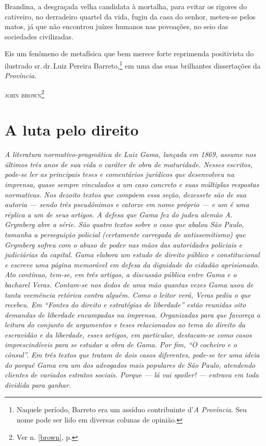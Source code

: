 Brandina, a desgraçada velha candidata à mortalha, para evitar os
rigores do cativeiro, no derradeiro quartel da vida, fugiu da casa do
senhor, meteu-se pelos matos, já que não encontrou juízes humanos nas
povoações, no seio das sociedades civilizadas.

Eis um fenômeno de metafísica que bem merece forte reprimenda
positivista do ilustrado sr.\,dr.\,Luiz Pereira Barreto,\footnote{Naquele
  período, Barreto era um assíduo contribuinte d'\emph{A Província}. Seu
  nome pode ser lido em diversas colunas de opinião.} em uma das suas
brilhantes dissertações da \emph{Província}.\medskip

\hfill\textsc{john brown}\footnote{Ver n. \ref{brown}, p. \pageref{brown}}

\part{A luta pelo direito} %


\begin{didas}
\emph{A literatura normativo-pragmática de Luiz Gama, lançada em 1869,
assume nos últimos três anos de sua vida o caráter de obra de
maturidade. Nesses escritos, pode-se ler as principais teses e
comentários jurídicos que desenvolveu na imprensa, quase sempre
vinculados a um caso concreto e suas múltiplas respostas normativas. Nos
dezoito textos que compõem essa seção, dezessete são de sua autoria ---
sendo três pseudônimos e catorze em nome próprio --- e um é uma réplica a
um de seus artigos. A defesa que Gama fez do judeu alemão A. Grymberg
abre a série. São quatro textos sobre o caso que abalou São Paulo,
tamanha a perseguição policial (certamente carregada de antissemitismo)
que Grymberg sofreu com o abuso de poder nas mãos das autoridades
policiais e judiciárias da capital. Gama elabora um estudo de direito
público e constitucional e escreve uma página memorável em defesa da
dignidade do cidadão aprisionado. Ato contínuo, tem-se, em três artigos,
a discussão pública entre Gama e o bacharel Veras. Contam-se nos dedos
de uma mão quantas vezes Gama usou de tanta veemência retórica contra
alguém. Como o leitor verá, Veras pediu o que recebeu. Em ``Fontes do
direito e estratégias de liberdade'' estão reunidas oito demandas
de liberdade encampadas na imprensa. Organizadas para que favoreça a
leitura do conjunto de argumentos e teses relacionados ao tema do
direito da escravidão e da liberdade, esses artigos, em particular,
destacam-se como casos imprescindíveis para se estudar a obra de Gama.
Por fim, ``O cocheiro e o cônsul''. Em três textos que tratam de
dois casos diferentes, pode-se ter uma ideia do porquê Gama era um dos
advogados mais populares de São Paulo, atendendo clientes de variados
estratos sociais. Porque --- lá vai spoiler! --- entrava em toda dividida
para ganhar.}
\end{didas}

